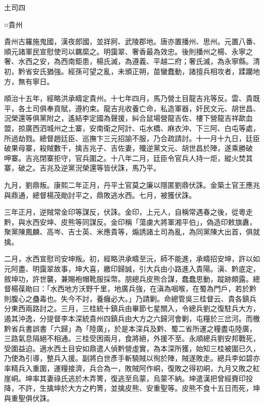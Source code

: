 
\begin{pinyinscope}
土司四

○貴州

貴州古羅施鬼國，漢夜郎國，並牂牁、武陵郡地。唐亦置播州、思州。元置八番、順元諸軍民宣慰使司以羈縻之。明靄翠、奢香最為效忠。後則播州之楊、永寧之奢、水西之安，為西南鉅患，楊氏滅，為遵義、平越二府；奢氏滅，為永寧縣。清初，黔省安氏猶強。經孫可望之亂，未頒正朔，苗蠻蠢動，諸擅兵相攻者，蹂躪地方，無有寧日。

順治十五年，經略洪承疇定貴州。十七年四月，馬乃營土目龍吉兆等反。雲、貴既平，各土司俱奉貢賦，遵約束。龍吉兆收養亡命，私造軍器，奸民文元、胡世昌、況榮還等俱黨附之，遙結李定國為聲援，糾合鼠場營龍吉佐、樓下營龍吉祥歃血盟，掠廣西泗城州之土寨，安南衛之阿計、屯水橋、麻衣沖、下三阿、白屯等處，所過劫戮。總督趙廷臣、巡撫卞三元招諭不服，乃合疏請討。十一月十九日，廷臣破果母寨，殺賊數千，擒吉兆子、吉佐妻，殲逆黨文元、胡世昌於陣，遂乘勝破呷寨。吉兆閉寨拒守，官兵圍之。十八年二月，廷臣令官兵人持一炬，縱火焚其寨，破之。吉兆及逆黨況榮還等皆伏誅，馬乃平。

九月，劉鼎叛。康熙二年正月，丹平土官莫之廉以隱匿劉鼎伏誅。金築土官王應兆與鼎通，總督楊茂勛討平之，鼎敗逃水西。七月，被獲伏誅。

三年正月，逆賊常金印等謀反，伏誅。金印，上元人，自稱常遇春之後，從粵走黔，與水西安坤、皮熊等同謀反。金印稱「蕩虜大將軍湘平伯」，偽造印敕旗纛，聚黨陳鳳麟、高岑、吉士英、米應貴等，煽誘諸土司為亂，為同黨陳大出首，俱就擒。

二月，水西宣慰司安坤叛。初，經略洪承疇至沅，師不能進，承疇招安坤，許以如元阿盡、明靄翠故事，坤大喜，繳印歸誠，引大兵由小路進入貴陽。滇、黔底定，敘坤功，許世襲，兼賜袍帽靴服採幣。朋總兵皮熊合謀，蠢蠢思動，蹤跡頗露。總督楊葆勛曰：「水西地方沃野千里，地廣兵強，在滇為咽喉，在蜀為門戶，若於黔則腹心之蠱毒也。失今不討，養癰必大。」乃請剿。命總管吳三桂督云、貴各鎮兵分東西兩路討之。三月，三桂統十鎮兵由畢節七星關入，令總兵劉之復駐兵大方，遏其沖逸，分提督李本深統貴州四鎮兵由大方之六歸河會剿，屯糧於三岔河。而檄黔省兵書誤書「六歸」為「陸廣」，於是本深兵及黔、蜀二省所運之糧盡屯陸廣，三路氣息隔絕不相通。三桂受困兩月，食將絕，外援不至。永順總兵劉安邦戰死，受圍益迫。適水西土目安如鼎遣人偵黔營虛實，為本深所獲，始知三桂被圍已久，乃使為引導，整兵入援。副將白世彥手斬驍賊以徇於陣，賊遂敗走。總兵李如碧亦率精兵入重圍，運糧接濟，兵合為一，敗賊阿作峒，復敗之得初峒，九月又敗之紅崖峒。坤率其妻祿氏逃於木弄箐，復逃至烏蒙，烏蒙不納。坤遣漢把曾經賚印投降，不許，生擒坤於大方之杓箐，並擒皮熊、安重聖等。皮熊不食十五日而死，坤與重聖俱伏誅。


\end{pinyinscope}
